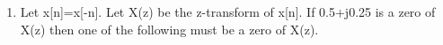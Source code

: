 \documentclass[journal,12pt,twocolumn]{IEEEtran}
\begin{document}
\begin{enumerate}
%
%

%
%
%




\item Let x[n]=x[-n]. Let X(z) be the z-transform of x[n]. If 0.5+j0.25 is a zero of X(z) then one of the following must be a zero of X(z).
\begin{enumerate}[(A)]

\end{enumerate}


\end{enumerate}
\end{document}
